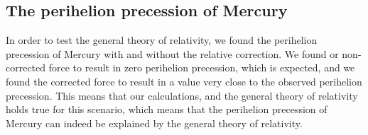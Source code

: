 \documentclass[../main.tex]{subfiles}
\begin{document}
\subsection{The perihelion precession of Mercury}
In order to test the general theory of relativity, we found the perihelion precession of Mercury with and without the relative correction. We found or non-corrected force to result in zero perihelion precession, which is expected, and we found the corrected force to result in a value very close to the observed perihelion precession. This means that our calculations, and the general theory of relativity holds true for this scenario, which means that the perihelion precession of Mercury can indeed be explained by the general theory of relativity.
\end{document}
